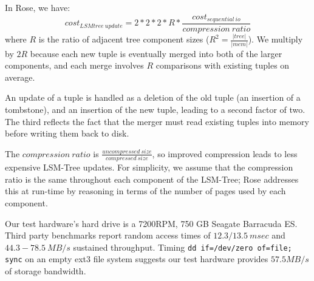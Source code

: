 \documentclass{vldb}
\newcommand{\rows}{Rose\xspace}
\begin{document}
In \rows, we have:
\[
   cost_{LSMtree~update}=2*2*2*R*\frac{cost_{sequential~io}}{compression~ratio}  %
\]
where $R$ is the ratio of adjacent tree component sizes
($R^2=\frac{|tree|}{|mem|}$).  We multiply by $2R$ because each new
tuple is eventually merged into both of the larger components, and
each merge involves $R$ comparisons with existing tuples on average.

An update of a tuple is handled as a deletion of the old tuple (an
insertion of a tombstone), and an insertion of the new tuple, leading
to a second factor of two.  The third reflects the fact that the
merger must read existing tuples into memory before writing them back
to disk.

The $compression~ratio$ is
$\frac{uncompressed~size}{compressed~size}$, so improved compression
leads to less expensive LSM-Tree updates.  For simplicity, we assume
that the compression ratio is the same throughout each component of
the LSM-Tree; \rows addresses this at run-time by reasoning in terms
of the number of pages used by each component.

Our test hardware's hard drive is a 7200RPM, 750 GB Seagate Barracuda
ES.  
Third party
benchmarks\cite{hdBench} %
report random access times of $12.3/13.5~msec$ and $44.3-78.5~MB/s$
sustained throughput.  Timing {\tt dd if=/dev/zero of=file; sync} on an
empty ext3 file system suggests our test hardware provides $57.5MB/s$ of
storage bandwidth.

\end{document}
